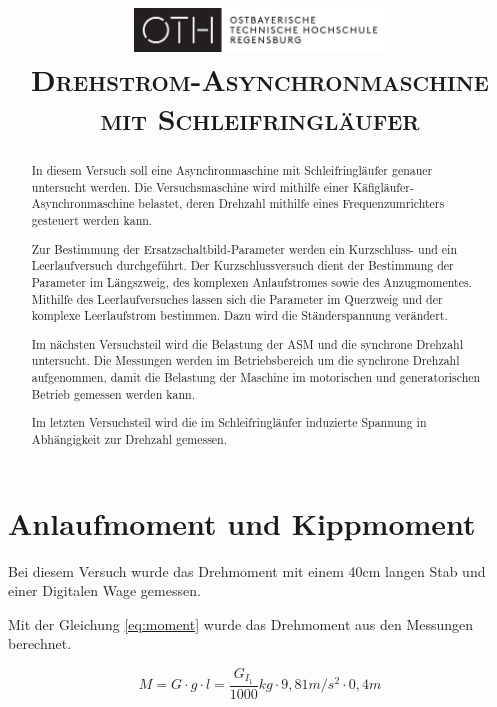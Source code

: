 \documentclass[conference]{IEEEtran}
\begin{document}
\title{
    \centering
    \includegraphics[width=0.5\textwidth]{../OTHR_OTHR_Logo.pdf}\\
    \textsc{Drehstrom-Asynchronmaschine mit Schleifringläufer} \\
}

\maketitle

\begin{abstract}
    In diesem Versuch soll eine Asynchronmaschine mit Schleifringläufer genauer
    untersucht werden. Die Versuchsmaschine wird mithilfe einer
    Käfigläufer-Asynchronmaschine belastet, deren Drehzahl mithilfe eines
    Frequenzumrichters gesteuert werden kann.

    Zur Bestimmung der Ersatzschaltbild-Parameter werden ein Kurzschluss- und
    ein Leerlaufversuch durchgeführt. Der Kurzschlussversuch dient der
    Bestimmung der Parameter im Längszweig, des komplexen Anlaufstromes sowie
    des Anzugmomentes. Mithilfe des Leerlaufversuches lassen sich die Parameter
    im Querzweig und der komplexe Leerlaufstrom bestimmen. Dazu wird die
    Ständerspannung verändert.

    Im nächsten Versuchsteil wird die Belastung der ASM und die synchrone
    Drehzahl untersucht. Die Messungen werden im Betriebsbereich um die
    synchrone Drehzahl aufgenommen, damit die Belastung der Maschine im
    motorischen und generatorischen Betrieb gemessen werden kann.

    Im letzten Versuchsteil wird die im Schleifringläufer induzierte Spannung
    in Abhängigkeit zur Drehzahl gemessen.

\end{abstract}

\section{Anlaufmoment und Kippmoment}

Bei diesem Versuch wurde das Drehmoment mit einem 40cm langen Stab und einer
Digitalen Wage gemessen.

Mit der Gleichung \ref{eq:moment} wurde das Drehmoment aus den Messungen berechnet.

\begin{equation} \label{eq:moment}
    M=G\cdot g\cdot l = \frac{G_{I_1}}{1000}\si{kg}\cdot 9,81\si{m/s^2} \cdot 0,4\si{m}
\end{equation}
\end{document}
